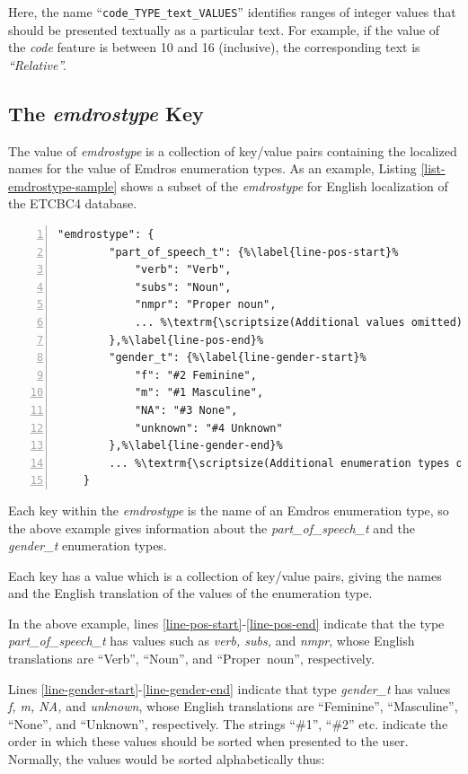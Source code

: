 \documentclass[11pt,oneside,a4paper]{memoir}
\begin{document}
Here, the name ``\texttt{code\_TYPE\_text\_VALUES}'' identifies ranges of integer values that should
be presented textually as a particular text. For example, if the value of the \emph{code} feature is
between 10 and 16 (inclusive), the corresponding text is \emph{``Relative''.}

\subsection{The \emph{emdrostype} Key}\label{enum-loc}

The value of \emph{emdrostype} is a collection of key/value pairs containing the localized names for
the value of Emdros enumeration types. As an example, Listing \ref{list-emdrostype-sample} shows
a subset of the \emph{emdrostype} for English localization of the ETCBC4 database.

\begin{lstlisting}[numbers=left,caption=A sample emdrostype value,label=list-emdrostype-sample]
    "emdrostype": {
        "part_of_speech_t": {%\label{line-pos-start}%
            "verb": "Verb",
            "subs": "Noun",
            "nmpr": "Proper noun",
            ... %\textrm{\scriptsize(Additional values omitted)}%
        },%\label{line-pos-end}%
        "gender_t": {%\label{line-gender-start}%
            "f": "#2 Feminine",
            "m": "#1 Masculine",
            "NA": "#3 None",
            "unknown": "#4 Unknown"
        },%\label{line-gender-end}%
        ... %\textrm{\scriptsize(Additional enumeration types omitted)}%
    }
\end{lstlisting}

Each key within the \emph{emdrostype} is the name of an Emdros enumeration type, so the above
example gives information about the \emph{part\_of\_speech\_t} and the \emph{gender\_t} enumeration
types.

Each key has a value which is a collection of key/value pairs, giving the names and the English
translation of the values of the enumeration type.

In the above example, lines \ref{line-pos-start}-\ref{line-pos-end} indicate that the type
\emph{part\_of\_speech\_t} has values such as \emph{verb, subs,} and \emph{nmpr}, whose English
translations are ``Verb'', ``Noun'', and ``Proper~noun'', respectively.

Lines \ref{line-gender-start}-\ref{line-gender-end} indicate that type \emph{gender\_t} has values
\emph{f, m, NA,} and \emph{unknown}, whose English translations are ``Feminine'', ``Masculine'',
``None'', and ``Unknown'', respectively. The strings ``\#1'', ``\#2'' etc. indicate the order in
which these values should be sorted when presented to the user. Normally, the values would be sorted
alphabetically thus:
\end{document}
